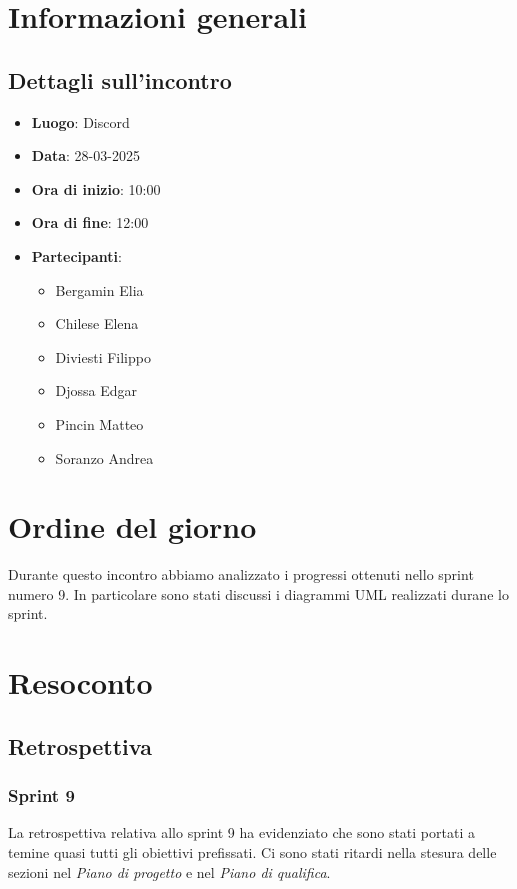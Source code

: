 \section{Informazioni generali}
\subsection{Dettagli sull'incontro}
\begin{itemize}
    \item \textbf{Luogo}: Discord
    \item \textbf{Data}: 28-03-2025
    \item \textbf{Ora di inizio}: 10:00
    \item \textbf{Ora di fine}: 12:00
    \item \textbf{Partecipanti}:
    \begin{itemize}
        \item Bergamin Elia
        \item Chilese Elena
        \item Diviesti Filippo
        \item Djossa Edgar
        \item Pincin Matteo 
        \item Soranzo Andrea  
    \end{itemize}
\end{itemize}

\section{Ordine del giorno}
Durante questo incontro abbiamo analizzato i progressi ottenuti nello sprint numero 9.
In particolare sono stati discussi i diagrammi UML realizzati durane lo sprint.
\section{Resoconto}
\subsection{Retrospettiva}
\subsubsection{Sprint 9}
La retrospettiva relativa allo sprint 9 ha evidenziato che sono stati portati a temine quasi tutti gli obiettivi prefissati.
Ci sono stati ritardi nella stesura delle sezioni nel \textit{Piano di progetto} e nel \textit{Piano di qualifica}.

